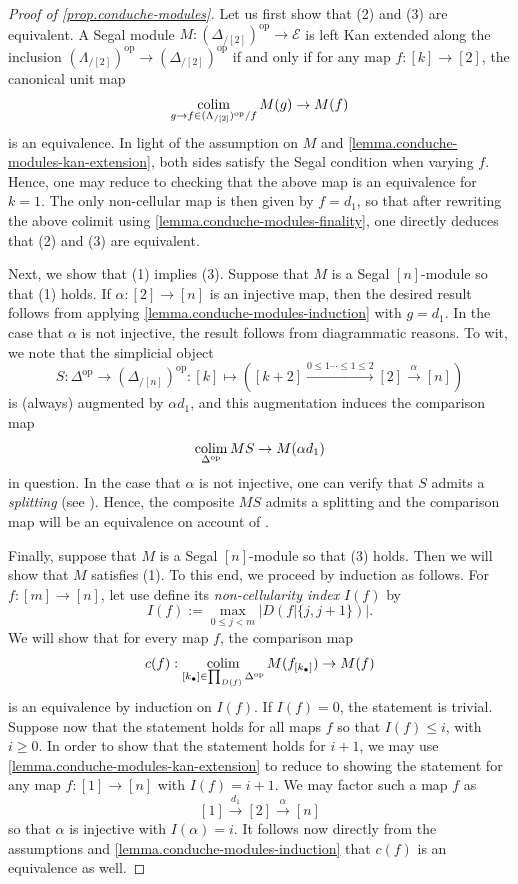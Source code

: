 \documentclass[a4paper, 11pt]{amsart}
\numberwithin{theorem}{section}
\theoremstyle{definition}
\newcommand{\op}{\mathrm{op}}
\def\colim{\qopname\relax m{colim}}
\newcommand{\E}{\mathscr{E}}
\newcommand{\abs}[1]{\left|#1\right|}
\begin{document}
\begin{proof}[Proof of \cref{prop.conduche-modules}]
	Let us first show that (2) and (3) are equivalent. A Segal module 
	$M : (\Delta_{/[2]})^\op \rightarrow \E$ is left Kan extended along the inclusion $(\Lambda_{/[2]})^\op \rightarrow (\Delta_{/[2]})^\op$ if and only if 
	for any map $f : [k] \rightarrow [2]$, the canonical unit map 
	$$
	\colim_{g \rightarrow f \in (\Lambda_{/[2]})^\op/f} M(g) \rightarrow M(f)
	$$
	is an equivalence. In light of the assumption on $M$ and 
	\cref{lemma.conduche-modules-kan-extension}, both sides satisfy the Segal condition when varying $f$.
	Hence, one may reduce to checking that the above map is an equivalence for $k = 1$. 
	The only non-cellular map is then given by $f = d_1$, so that after
	rewriting the above colimit using \cref{lemma.conduche-modules-finality}, one directly deduces that (2) and (3) are equivalent.
	
	Next, we show that (1) implies (3). Suppose that $M$ 
	is a Segal $[n]$-module so that (1) holds. If $\alpha : [2] \rightarrow [n]$ 
	is an injective map, then the desired result 
	follows from applying \cref{lemma.conduche-modules-induction} with $g = d_1$. In the case 
	that $\alpha$ is not injective, the result follows from diagrammatic reasons. 
	To wit, we note that the simplicial object 
	$$
	S : \Delta^\op \rightarrow (\Delta_{/[n]})^\op : [k] \mapsto ([k+2] \xrightarrow{0 \leq 1 \dotsb \leq 1 \leq 2} [2] \xrightarrow{\alpha} [n]) 
	$$
	is (always) augmented by $\alpha d_1$, and this augmentation induces the comparison map
	$$
	\colim_{\Delta^\op} MS \rightarrow M(\alpha d_1)
	$$
	in question.
	In the case that
	$\alpha$ is not injective, one can verify that $S$ admits a \textit{splitting} (see \cite[Definition 2.3.13]{RiehlVerity}). 
	Hence, the composite $MS$ admits a splitting and the comparison map will be an equivalence on account of \cite[Proposition 2.3.15]{RiehlVerity}.

	Finally, suppose that $M$ is a Segal $[n]$-module so that (3) holds. Then we will show that $M$ satisfies (1). 
	To this end, we proceed by induction as follows. 
	For $f : [m] \rightarrow [n]$, let use define its \textit{non-cellularity index} $I(f)$ by 
	$$
	I(f) := \max_{0\leq j < m} \abs{D(f|\{j,j+1\})}.
	$$
	We will show that for every map $f$, the comparison map 
	$$
	c(f) : \colim_{[k_\bullet] \in \prod_{D(f)}\Delta^\op} M(f_{[k_\bullet]}) \rightarrow M(f)
	$$
	is an equivalence by induction on $I(f)$. If $I(f) = 0$, the statement is trivial. 
	Suppose now that the statement holds for all maps $f$ so that $I(f) \leq i$, with $i \geq 0$. In order to show that the statement holds for $i+1$, 
	we may use \cref{lemma.conduche-modules-kan-extension} to reduce to showing the statement 
	for any map $f : [1] \rightarrow [n]$ with $I(f) = i+1$. We may factor such a map $f$ as 
	$$
	[1] \xrightarrow{d_1} [2] \xrightarrow{\alpha} [n]
	$$
	so that $\alpha$ is injective with $I(\alpha) = i$. 
	It follows now directly from the assumptions and \cref{lemma.conduche-modules-induction} that $c(f)$ is an equivalence as well. 
\end{proof}
\end{document}
